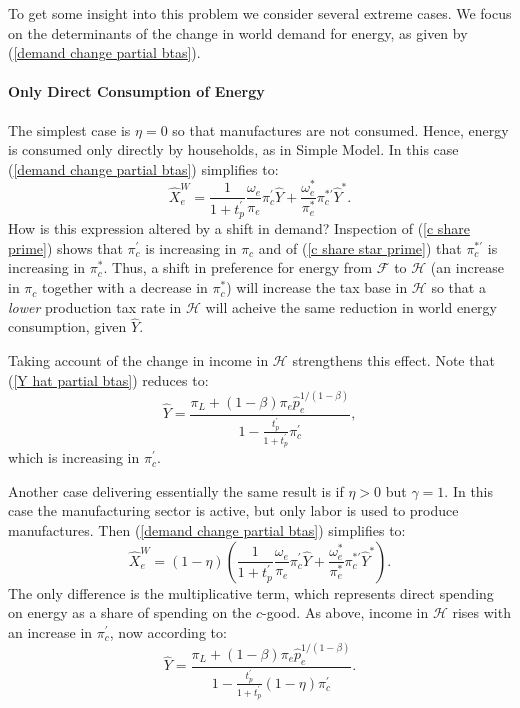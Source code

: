 \documentclass[notitlepage,12pt]{article}
\begin{document}
To get some insight into this problem we consider several extreme cases. We
focus on the determinants of the change in world demand for energy, as given
by (\ref{demand change partial btas}).

\paragraph{Only Direct Consumption of Energy}

The simplest case is $\eta =0$ so that manufactures are not consumed. Hence,
energy is consumed only directly by households, as in Simple Model. In this
case (\ref{demand change partial btas}) simplifies to:%
\begin{equation*}
\hat{X}_{e}^{W}=\frac{1}{1+t_{p}^{\prime }}\frac{\omega _{e}}{\pi _{e}}\pi
_{c}^{\prime }\hat{Y}+\frac{\omega _{e}^{\ast }}{\pi _{e}^{\ast }}\pi
_{c}^{\ast \prime }\hat{Y}^{\ast }.
\end{equation*}%
How is this expression altered by a shift in demand? Inspection of (\ref{c
share prime}) shows that $\pi _{c}^{\prime }$ is increasing in $\pi _{c}$
and of (\ref{c share star prime}) that $\pi _{c}^{\ast \prime }$ is
increasing in $\pi _{c}^{\ast }$. Thus, a shift in preference for energy
from $\mathcal{F}$ to $\mathcal{H}$ (an increase in $\pi _{c}$ together with
a decrease in $\pi _{c}^{\ast }$) will increase the tax base in $\mathcal{H}$
so that a \emph{lower} production tax rate in $\mathcal{H}$ will acheive the
same reduction in world energy consumption, given $\hat{Y}$.

Taking account of the change in income in $\mathcal{H}$ strengthens this
effect. Note that (\ref{Y hat partial btas}) reduces to:%
\begin{equation*}
\hat{Y}=\frac{\pi _{L}+\left( 1-\beta \right) \pi _{e}\hat{p}%
_{e}^{1/(1-\beta )}}{1-\frac{t_{p}^{\prime }}{1+t_{p}^{\prime }}\pi
_{c}^{\prime }},
\end{equation*}%
which is increasing in $\pi _{c}^{\prime }$.

Another case delivering essentially the same result is if $\eta >0$ but $%
\gamma =1$. In this case the manufacturing sector is active, but only labor
is used to produce manufactures. Then (\ref{demand change partial btas})
simplifies to:%
\begin{equation*}
\hat{X}_{e}^{W}=\left( 1-\eta \right) \left( \frac{1}{1+t_{p}^{\prime }}%
\frac{\omega _{e}}{\pi _{e}}\pi _{c}^{\prime }\hat{Y}+\frac{\omega
_{e}^{\ast }}{\pi _{e}^{\ast }}\pi _{c}^{\ast \prime }\hat{Y}^{\ast }\right)
.
\end{equation*}%
The only difference is the multiplicative term, which represents direct
spending on energy as a share of spending on the $c$-good. As above, income
in $\mathcal{H}$ rises with an increase in $\pi _{c}^{\prime }$, now
according to:%
\begin{equation*}
\hat{Y}=\frac{\pi _{L}+\left( 1-\beta \right) \pi _{e}\hat{p}%
_{e}^{1/(1-\beta )}}{1-\frac{t_{p}^{\prime }}{1+t_{p}^{\prime }}\left(
1-\eta \right) \pi _{c}^{\prime }}.
\end{equation*}
\end{document}
